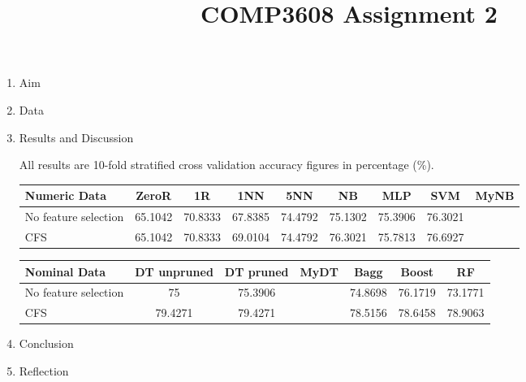 \documentclass[a4paper, 12pt]{article}
\begin{document}
\title{COMP3608 Assignment 2}
\maketitle

\begin{enumerate}
    \item Aim
    \item Data
    \item Results and Discussion

        All results are 10-fold stratified cross validation accuracy figures in percentage (\%).

        \begin{tabular}{|m{2cm}*{8}{|c}|}
            \hline
            Numeric Data & ZeroR & 1R & 1NN &5NN &NB &MLP &SVM & MyNB \\
            \hline
            No feature selection & 65.1042 &70.8333 &67.8385 &74.4792 &75.1302 &75.3906 &76.3021 \\
            \hline
            CFS & 65.1042 &70.8333 &69.0104 &74.4792 &76.3021 &75.7813&76.6927 \\
            \hline
        \end{tabular}

        \begin{tabular}{|m{2cm}*{6}{|c}|}
            \hline
            Nominal Data & DT unpruned &DT pruned &MyDT &Bagg &Boost &RF \\
            \hline
            No feature selection &75 & 75.3906 & &74.8698&76.1719&73.1771 \\
            \hline
            CFS & 79.4271 & 79.4271 & & 78.5156 & 78.6458 & 78.9063 \\
            \hline
        \end{tabular}

        \begin{obeylines}
            
            
        \end{obeylines}
    \item Conclusion
    \item Reflection
\end{enumerate}
\end{document}
